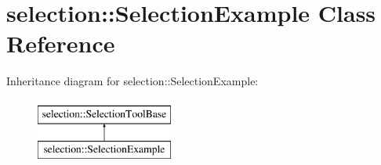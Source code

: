 \hypertarget{classselection_1_1SelectionExample}{\section{selection\-:\-:Selection\-Example Class Reference}
\label{classselection_1_1SelectionExample}
}
Inheritance diagram for selection\-:\-:Selection\-Example\-:\begin{figure}[H]
\begin{center}
\leavevmode
\includegraphics[height=2.000000cm]{classselection_1_1SelectionExample}
\end{center}
\end{figure}
